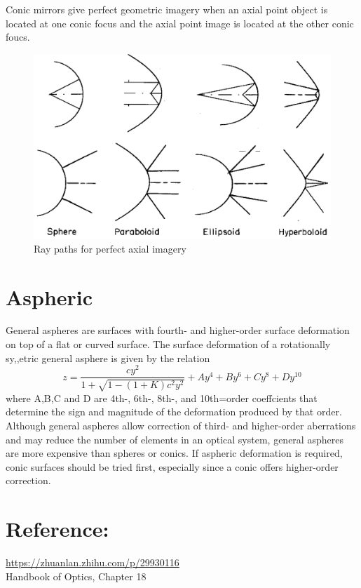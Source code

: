\documentclass[../main.tex]{subfiles}
\begin{document}
	Conic mirrors give perfect geometric imagery when an axial point object is located at one conic focus and the axial point image is located at the other conic foucs.
	\begin{figure}[h!]
	  \centering
	  \includegraphics[scale=0.5]{../graphics/aspheric_4.png}
	  \caption{Ray paths for perfect axial imagery}
	  \label{fig:conic_ray}
	\end{figure}

	\section{Aspheric}
	General aspheres are surfaces with fourth- and higher-order surface deformation on top of a flat or curved surface. The surface deformation of a rotationally sy,,etric general asphere is given by the relation
	\begin{equation}
		z = \frac{cy^2}{1+\sqrt{1-(1+K)c^2y^2}}+Ay^4+By^6+Cy^8+Dy^10
	\end{equation}
	where A,B,C and D are 4th-, 6th-, 8th-, and 10th=order coeffcients that determine the sign and magnitude of the deformation produced by that order. Although general aspheres allow correction of third- and higher-order aberrations and may reduce the number of elements in an optical system, general aspheres are more expensive than spheres or conics. If aspheric deformation is required, conic surfaces should be tried first, especially since a conic offers higher-order correction.

	\section{Reference:}
	\url{https://zhuanlan.zhihu.com/p/29930116}\\
	Handbook of Optics, Chapter 18
\end{document}
